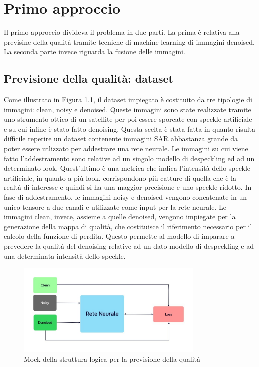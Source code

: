 
\chapter{Primo approccio}
Il primo approccio divideva il problema in due parti. La prima è relativa alla previsine della qualità tramite tecniche 
di machine learning di immagini denoised. La seconda parte invece riguarda la fusione delle immagini.

\section{Previsione della qualità: dataset}



Come illustrato in Figura \ref{fig:MockReteNeurale}, il dataset impiegato è costituito da tre tipologie di 
immagini: clean, noisy e denoised. Queste immagini sono state realizzate tramite uno strumento ottico di un
satellite per poi essere sporcate con speckle artificiale e su cui infine è stato fatto denoising. Questa scelta è stata fatta
in quanto risulta difficile reperire un dataset contenente immagini SAR abbastanza grande da poter essere utlizzato per 
addestrare una rete neurale. Le immagini su cui viene fatto l'addestramento sono relative ad un singolo modello di despeckling ed ad 
un determinato look. Quest'ultimo è una metrica che indica l'intensità dello speckle artificiale, in quanto a più look.
corrispondono più catture di quella che è la realtà di interesse e quindi si ha una maggior precisione e uno speckle ridotto.
In fase di addestramento, le immagini noisy e denoised vengono concatenate in un unico tensore a due canali e utilizzate come 
input per la rete neurale. Le immagini clean, invece, assieme a quelle denoised, vengono impiegate per la 
generazione della mappa di qualità, che costituisce il riferimento necessario per 
il calcolo della funzione di perdita. Questo permette al modello di imparare a 
prevedere la qualità del denoising relative ad un dato modello di despeckling e ad una determinata intensità dello speckle. 
\begin{figure}[H]
    \centering
    \includegraphics[width=0.8\textwidth]{utils/Architettura_rete_neurale.jpg}
    \caption{Mock della struttura logica per la previsione della qualità}
    \label{fig:MockReteNeurale}
\end{figure}

